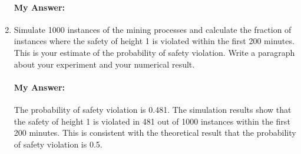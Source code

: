 \documentclass{article}
\begin{document}
\begin{enumerate}[label=(\alph*)]
        \paragraph*{My Answer:}
        
        
    \item Simulate 1000 instances of the mining processes and calculate the fraction of instances where the safety of height 1 is violated within the first 200 minutes. This is your estimate of the probability of safety violation. Write a paragraph about your experiment and your numerical result.
        \paragraph*{My Answer:}
        The probability of safety violation is 0.481. The simulation results show that the safety of height 1 is violated in 481 out of 1000 instances within the first 200 minutes. This is consistent with the theoretical result that the probability of safety violation is 0.5.  
        
\end{enumerate}
\end{document}
